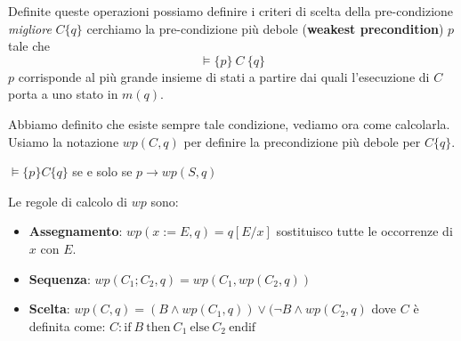 Definite queste operazioni possiamo definire i criteri di scelta della pre-condizione \textit{migliore} $C \{q\}$ cerchiamo la pre-condizione più debole (\textbf{weakest precondition}) $p$ tale che $$\models \{p\} \ C \ \{q\}$$ $p$ corrisponde al più grande insieme di stati a partire dai quali l'esecuzione di $C$ porta a uno stato in $m(q)$.

Abbiamo definito che esiste sempre tale condizione, vediamo ora come calcolarla. Usiamo la notazione $wp(C, q)$ per definire la precondizione più debole per $C \{q\}$.
\begin{teorema}
    $\models \{p\} C \{q\}$ se e solo se $p \to wp(S, q)$
\end{teorema}
Le regole di calcolo di $wp$ sono:
\begin{itemize}
    \item \textbf{Assegnamento}: $wp(x := E, q) = q[E / x]$ sostituisco tutte le occorrenze di $x$ con $E$.
    \item \textbf{Sequenza}: $wp(C_1;C_2, q) = wp(C_1, wp(C_2, q))$
    \item \textbf{Scelta}: $wp(C, q) = (B \land wp(C_1, q)) \lor (\lnot B \land wp(C_2, q)$ dove $C$ è definita come: $C: \text{if} \ B \ \text{then} \ C_1 \ \text{else} \ C_2 \ \text{endif}$
\end{itemize}